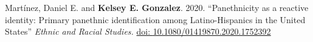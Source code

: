  Martínez, Daniel E. and \textbf{Kelsey E. Gonzalez}. 2020. ``Panethnicity as a reactive identity: Primary panethnic identification among Latino-Hispanics in the United States''
\textit{Ethnic and Racial Studies.}
\href{https://doi.org/10.1080/01419870.2020.1752392}{doi: \underline{10.1080/01419870.2020.1752392}} \\




